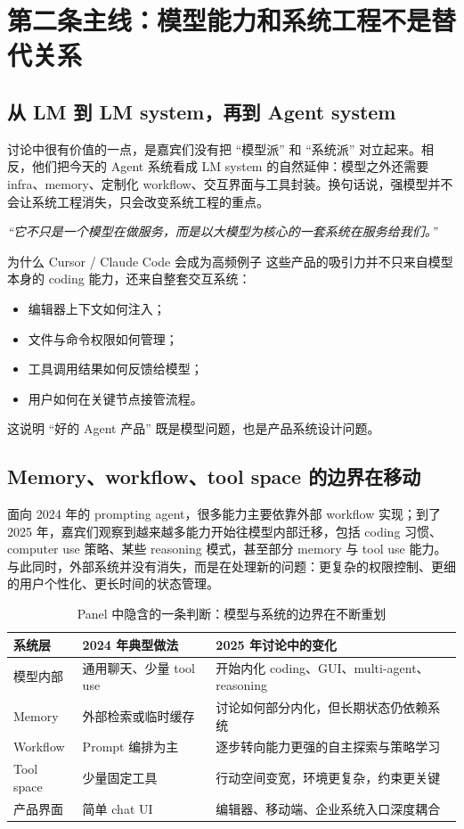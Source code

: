 \section{第二条主线：模型能力和系统工程不是替代关系}

\subsection{从 LM 到 LM system，再到 Agent system}
讨论中很有价值的一点，是嘉宾们没有把 ``模型派'' 和 ``系统派'' 对立起来。相反，他们把今天的 Agent 系统看成 LM system 的自然延伸：模型之外还需要 infra、memory、定制化 workflow、交互界面与工具封装。换句话说，强模型并不会让系统工程消失，只会改变系统工程的重点。

\textit{``它不只是一个模型在做服务，而是以大模型为核心的一套系统在服务给我们。''}

\begin{importantbox}{为什么 Cursor / Claude Code 会成为高频例子}
这些产品的吸引力并不只来自模型本身的 coding 能力，还来自整套交互系统：
\begin{itemize}
  \item 编辑器上下文如何注入；
  \item 文件与命令权限如何管理；
  \item 工具调用结果如何反馈给模型；
  \item 用户如何在关键节点接管流程。
\end{itemize}
这说明 ``好的 Agent 产品'' 既是模型问题，也是产品系统设计问题。
\end{importantbox}

\subsection{Memory、workflow、tool space 的边界在移动}
面向 2024 年的 prompting agent，很多能力主要依靠外部 workflow 实现；到了 2025 年，嘉宾们观察到越来越多能力开始往模型内部迁移，包括 coding 习惯、computer use 策略、某些 reasoning 模式，甚至部分 memory 与 tool use 能力。与此同时，外部系统并没有消失，而是在处理新的问题：更复杂的权限控制、更细的用户个性化、更长时间的状态管理。

\begin{table}[H]
\centering
\begin{tabular}{p{3.0cm}p{4.3cm}p{4.3cm}}
\toprule
\textbf{系统层} & \textbf{2024 年典型做法} & \textbf{2025 年讨论中的变化} \\
\midrule
模型内部 & 通用聊天、少量 tool use & 开始内化 coding、GUI、multi-agent、reasoning \\
Memory & 外部检索或临时缓存 & 讨论如何部分内化，但长期状态仍依赖系统 \\
Workflow & Prompt 编排为主 & 逐步转向能力更强的自主探索与策略学习 \\
Tool space & 少量固定工具 & 行动空间变宽，环境更复杂，约束更关键 \\
产品界面 & 简单 chat UI & 编辑器、移动端、企业系统入口深度耦合 \\
\bottomrule
\end{tabular}
\caption{Panel 中隐含的一条判断：模型与系统的边界在不断重划}
\end{table}


